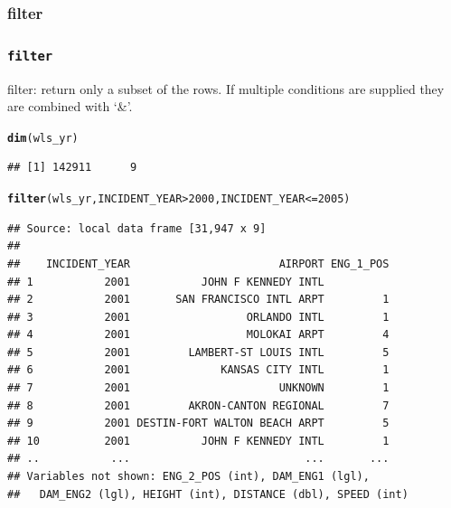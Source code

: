\documentclass{beamer}\usepackage[]{graphicx}\usepackage[]{color}
\makeatletter
\newcommand{\hlnum}[1]{\textcolor[rgb]{0.686,0.059,0.569}{#1}}%
\newcommand{\hlopt}[1]{\textcolor[rgb]{0,0,0}{#1}}%
\newcommand{\hlstd}[1]{\textcolor[rgb]{0.345,0.345,0.345}{#1}}%
\newcommand{\hlkwd}[1]{\textcolor[rgb]{0.737,0.353,0.396}{\textbf{#1}}}%
\newenvironment{kframe}{%
 \def\at@end@of@kframe{}%
 \ifinner\ifhmode%
  \def\at@end@of@kframe{\end{minipage}}%
  \begin{minipage}{\columnwidth}%
 \fi\fi%
 \def\FrameCommand##1{\hskip\@totalleftmargin \hskip-\fboxsep
 \colorbox{shadecolor}{##1}\hskip-\fboxsep
     \hskip-\linewidth \hskip-\@totalleftmargin \hskip\columnwidth}%
 \MakeFramed {\advance\hsize-\width
   \@totalleftmargin\z@ \linewidth\hsize
   \@setminipage}}%
 {\par\unskip\endMakeFramed%
 \at@end@of@kframe}
\newenvironment{knitrout}{}{} %
\makeatother
\begin{document}
\subsubsection{filter}%
\begin{frame}[fragile]
  \frametitle{{\tt filter}}
filter: return only a subset of the rows. If multiple
conditions are supplied they are combined with ‘\&’.
\begin{knitrout}\footnotesize
{}\color{fgcolor}\begin{kframe}
\begin{alltt}
\hlkwd{dim}\hlstd{(wls_yr)}
\end{alltt}
\begin{verbatim}
## [1] 142911      9
\end{verbatim}
\begin{alltt}
\hlkwd{filter}\hlstd{(wls_yr, INCIDENT_YEAR} \hlopt{>} \hlnum{2000}\hlstd{, INCIDENT_YEAR} \hlopt{<=} \hlnum{2005}\hlstd{)}
\end{alltt}
\begin{verbatim}
## Source: local data frame [31,947 x 9]
## 
##    INCIDENT_YEAR                       AIRPORT ENG_1_POS
## 1           2001           JOHN F KENNEDY INTL          
## 2           2001       SAN FRANCISCO INTL ARPT         1
## 3           2001                  ORLANDO INTL         1
## 4           2001                  MOLOKAI ARPT         4
## 5           2001         LAMBERT-ST LOUIS INTL         5
## 6           2001              KANSAS CITY INTL         1
## 7           2001                       UNKNOWN         1
## 8           2001         AKRON-CANTON REGIONAL         7
## 9           2001 DESTIN-FORT WALTON BEACH ARPT         5
## 10          2001           JOHN F KENNEDY INTL         1
## ..           ...                           ...       ...
## Variables not shown: ENG_2_POS (int), DAM_ENG1 (lgl),
##   DAM_ENG2 (lgl), HEIGHT (int), DISTANCE (dbl), SPEED (int)
\end{verbatim}
\end{kframe}
\end{knitrout}
\end{frame} 
\end{document}
